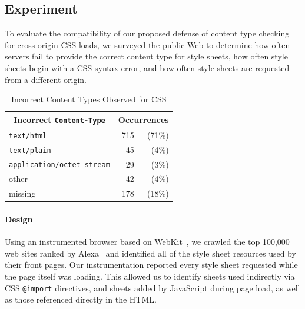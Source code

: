 \documentclass{acm_proc_article-sp}
\begin{document}
\subsection{Experiment}
To evaluate the compatibility of our proposed defense of content
type checking for cross-origin CSS loads, we surveyed the public
Web to determine how often servers fail to provide the correct
content type for style sheets, how often style sheets begin with
a CSS syntax error, and how often style sheets are requested
from a different origin.

\begin{table}[b]
\centering
\begin{tabular}{lrr}
\toprule
\multicolumn{1}{c}{Incorrect \texttt{Content-Type}}&
\multicolumn{2}{c}{Occurrences}\\
\midrule
               \texttt{text/html}& 715& (71\%)\\
              \texttt{text/plain}&  45&  (4\%)\\
\texttt{application/octet-stream}&  29&  (3\%)\\
                            other&  42&  (4\%)\\
                           missing& 178& (18\%)\\
\bottomrule
\end{tabular}
\caption{Incorrect Content Types Observed for CSS}
\label{table:MIME}
\end{table}

\paragraph{Design}
Using an instrumented browser based on WebKit~\cite{webkit}, we
crawled the top 100,000 web sites ranked by Alexa~\cite{alexa} and
identified all of the style sheet resources used by their front pages.
Our instrumentation reported every style sheet requested while the
page itself was loading.  This allowed us to identify sheets used
indirectly via CSS \verb|@import| directives, and sheets added by
JavaScript during page load, as well as those referenced directly in
the HTML.
\end{document}
